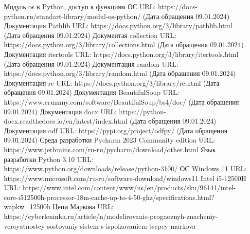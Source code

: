 \begin{thebibliography}{}
	Модуль os в Python, доступ к функциям ОС
    URL: https://docs-python.ru/standart-library/modul-os-python/  (Дата обращения 09.01.2024)
	Документация Pathlib
	URL: https://docs.python.org/3/library/pathlib.html (Дата обращения 09.01.2024)
	Документая collection
	URL: https://docs.python.org/3/library/collections.html (Дата обращения 09.01.2024)
	Документация itertools
	URL: https://docs.python.org/3/library/itertools.html (Дата обращения 09.01.2024)
	Документация random
	URL: https://docs.python.org/3/library/random.html (Дата обращения 09.01.2024)
	Документация re
	URL: https://docs.python.org/3/library/re.html (Дата обращения 09.01.2024)
	Документация BeautifulSoup
	URL: https://www.crummy.com/software/BeautifulSoup/bs4/doc/ (Дата обращения 09.01.2024)
	Документация docx
	URL: https://python-docx.readthedocs.io/en/latest/index.html (Дата обращения 09.01.2024)
	Документация odf
	URL: https://pypi.org/project/odfpy/ (Дата обращения 09.01.2024)
	Среда разработки Pycharm 2023 Community edition
	URL: https://www.jetbrains.com/ru-ru/pycharm/download/other.html
	Язык разработки Python 3.10
	URL: https://www.python.org/downloads/release/python-3100/
	ОС Windows 11
	URL: https://www.microsoft.com/ru-ru/software-download/windows11
	Intel i5-12500H
	URL: https://www.intel.com/content/www/us/en/products/sku/96141/intel-core-i512500h-processor-18m-cache-up-to-4-50-ghz/specifications.html?wapkw=12500h
	Цепи Маркова
	URL: https://cyberleninka.ru/article/n/modelirovanie-prognoznyh-znacheniy-veroyatnostey-sostoyaniy-sistem-s-ispolzovaniem-tsepey-markova
	
\end{thebibliography}